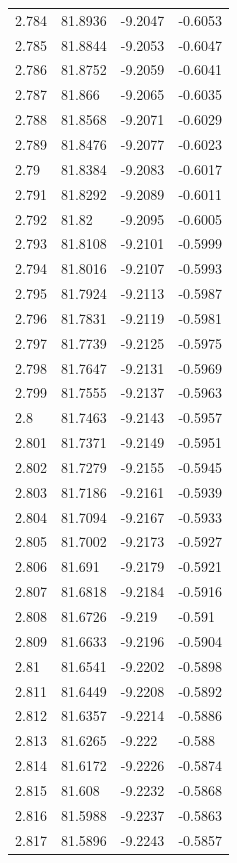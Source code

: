 \begin{tabular}{llll}
2.784 & 81.8936 & -9.2047 & -0.6053 \\
2.785 & 81.8844 & -9.2053 & -0.6047 \\
2.786 & 81.8752 & -9.2059 & -0.6041 \\
2.787 & 81.866 & -9.2065 & -0.6035 \\
2.788 & 81.8568 & -9.2071 & -0.6029 \\
2.789 & 81.8476 & -9.2077 & -0.6023 \\
2.79 & 81.8384 & -9.2083 & -0.6017 \\
2.791 & 81.8292 & -9.2089 & -0.6011 \\
2.792 & 81.82 & -9.2095 & -0.6005 \\
2.793 & 81.8108 & -9.2101 & -0.5999 \\
2.794 & 81.8016 & -9.2107 & -0.5993 \\
2.795 & 81.7924 & -9.2113 & -0.5987 \\
2.796 & 81.7831 & -9.2119 & -0.5981 \\
2.797 & 81.7739 & -9.2125 & -0.5975 \\
2.798 & 81.7647 & -9.2131 & -0.5969 \\
2.799 & 81.7555 & -9.2137 & -0.5963 \\
2.8 & 81.7463 & -9.2143 & -0.5957 \\
2.801 & 81.7371 & -9.2149 & -0.5951 \\
2.802 & 81.7279 & -9.2155 & -0.5945 \\
2.803 & 81.7186 & -9.2161 & -0.5939 \\
2.804 & 81.7094 & -9.2167 & -0.5933 \\
2.805 & 81.7002 & -9.2173 & -0.5927 \\
2.806 & 81.691 & -9.2179 & -0.5921 \\
2.807 & 81.6818 & -9.2184 & -0.5916 \\
2.808 & 81.6726 & -9.219 & -0.591 \\
2.809 & 81.6633 & -9.2196 & -0.5904 \\
2.81 & 81.6541 & -9.2202 & -0.5898 \\
2.811 & 81.6449 & -9.2208 & -0.5892 \\
2.812 & 81.6357 & -9.2214 & -0.5886 \\
2.813 & 81.6265 & -9.222 & -0.588 \\
2.814 & 81.6172 & -9.2226 & -0.5874 \\
2.815 & 81.608 & -9.2232 & -0.5868 \\
2.816 & 81.5988 & -9.2237 & -0.5863 \\
2.817 & 81.5896 & -9.2243 & -0.5857 \\

\end{tabular}
